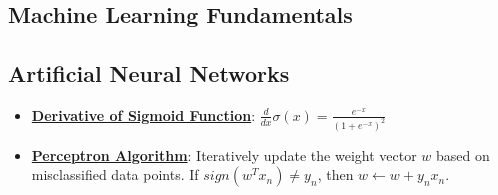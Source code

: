 \documentclass{article}%
\begin{document}
%
\subsection{Machine Learning Fundamentals}%
\label{subsec:MachineLearningFundamentals}%
\begin{itemize}[leftmargin=*]%
%
\end{itemize}

%
\subsection{Artificial Neural Networks}%
\label{subsec:ArtificialNeuralNetworks}%
\begin{itemize}[leftmargin=*]%
\item \href{https://purdue.brightspace.com/d2l/common/assets/pdfjs-d2l-dist/1.0.14-legacy/web/viewer.html?file=\%2Fcontent\%2Fenforced\%2F1095467-wl.202510.CS.24300.001\%2F04L1-Linear Algebra Primer.pdf\%3Fou\%3D1095467\&lang=en-us\&container=d2l-fileviewer-rendered-pdf\&fullscreen=d2l-fileviewer-rendered-pdf-dialog\&height=667#page=21}{\textbf{Derivative of Sigmoid Function}}: $\frac{d}{dx} \sigma(x) = \frac{e^{-x}}{(1 + e^{-x})^2}$%
\item \href{https://purdue.brightspace.com/d2l/common/assets/pdfjs-d2l-dist/1.0.14-legacy/web/viewer.html?file=\%2Fcontent\%2Fenforced\%2F1095467-wl.202510.CS.24300.001\%2F05L2-ML Basics.pdf\%3Fou\%3D1095467\&lang=en-us\&container=d2l-fileviewer-rendered-pdf\&fullscreen=d2l-fileviewer-rendered-pdf-dialog\&height=667#page=30}{\textbf{Perceptron Algorithm}}: Iteratively update the weight vector $w$ based on misclassified data points. If $sign(w^Tx_n) \ne y_n$, then $w \leftarrow w + y_nx_n$.%
\end{itemize}

%
\end{document}
